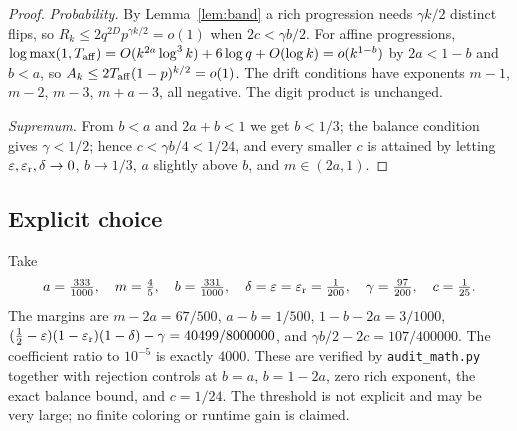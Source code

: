 \documentclass[11pt]{article}
\begin{document}
\begin{proof}
\emph{Probability.} By Lemma~\ref{lem:band} a rich progression needs
$\gamma k/2$ distinct flips, so
$R_k\le2q^{2D}p^{\gamma k/2}=o(1)$ when $2c<\gamma b/2$.
For affine progressions,
$\log\max(1,T_{\rm aff})=O(k^{2a}\log^3k)+6\log q+O(\log k)=o(k^{1-b})$
by $2a<1-b$ and $b<a$, so $A_k\le2T_{\rm aff}(1-p)^{k/2}=o(1)$.
The drift conditions have exponents $m-1$, $m-2$, $m-3$, $m+a-3$, all
negative. The digit product is unchanged.

\emph{Supremum.} From $b<a$ and $2a+b<1$ we get $b<1/3$; the balance
condition gives $\gamma<1/2$; hence $c<\gamma b/4<1/24$, and every
smaller $c$ is attained by letting $\varepsilon,\varepsilon_{\rm r},\delta\to0$,
$b\to1/3$, $a$ slightly above $b$, and $m\in(2a,1)$.
\end{proof}

\subsection{Explicit choice}
Take
\[
 a=\tfrac{333}{1000},\quad m=\tfrac45,\quad b=\tfrac{331}{1000},\quad
 \delta=\varepsilon=\varepsilon_{\rm r}=\tfrac1{200},\quad
 \gamma=\tfrac{97}{200},\quad c=\tfrac1{25}.
\]
The margins are $m-2a=67/500$, $a-b=1/500$, $1-b-2a=3/1000$,
$(\frac12-\varepsilon)(1-\varepsilon_{\rm r})(1-\delta)-\gamma=40499/8000000$,
and $\gamma b/2-2c=107/400000$. The coefficient ratio to $10^{-5}$ is
exactly $4000$. These are verified by \texttt{audit\_math.py} together
with rejection controls at $b=a$, $b=1-2a$, zero rich exponent, the
exact balance bound, and $c=1/24$. The threshold is not explicit and
may be very large; no finite coloring or runtime gain is claimed.
\end{document}
